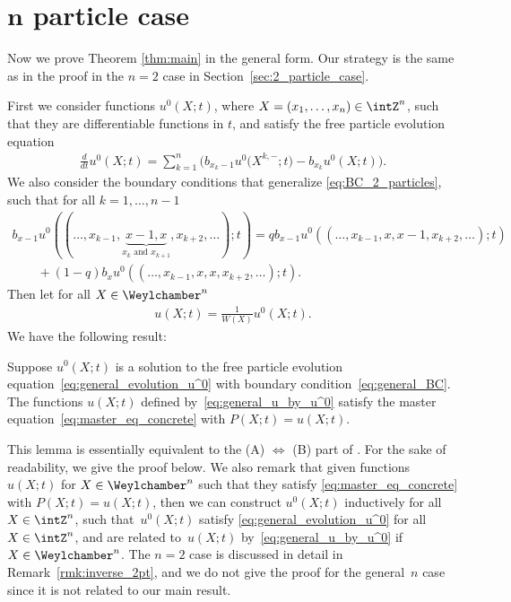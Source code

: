 \section[$n$ particle case]{$\boldsymbol{n}$ particle case} \label{sec:n_particle_case}

Now we prove Theorem \ref{thm:main} in the general form. Our strategy is the same as in the proof in the $n = 2$ case in Section~\ref{sec:2_particle_case}.

First we consider functions $u^0(X; t)$, where $X = (x_1, \dotsc, x_n) \in \intZ^n$, such that they are dif\/ferentiable functions in $t$, and satisfy the free particle evolution equation
\begin{gather} \label{eq:general_evolution_u^0}
 \frac{d}{dt} u^0(X; t) = \sum^n_{k = 1} \big( b_{x_k - 1} u^0\big(X^{k, -}; t\big) - b_{x_k} u^0(X; t) \big).
\end{gather}
We also consider the boundary conditions that generalize \eqref{eq:BC_2_particles}, such that for all $k = 1, \dotsc, n - 1$
\begin{gather}
 b_{x - 1} u^0((\dotsc, x_{k - 1}, \underbrace{x - 1, x}_{\text{$x_k$ and $x_{k + 1}$}}, x_{k + 2}, \dotsc); t) = q b_{x - 1} u^0((\dotsc, x_{k - 1}, x, x - 1, x_{k + 2}, \dotsc); t) \nonumber\\
 \qquad{}
+ (1 - q) b_x u^0((\dotsc, x_{k - 1}, x, x, x_{k + 2}, \dotsc); t).\label{eq:general_BC}
\end{gather}
Then let for all $X \in \Weylchamber^n$
\begin{gather} \label{eq:general_u_by_u^0}
 u(X; t) = \frac{1}{W(X)} u^0(X; t).
\end{gather}
We have the following result:
\begin{Lemma} \label{lem:BA_coefficients}
 Suppose $u^0(X; t)$ is a solution to the free particle evolution equation~\eqref{eq:general_evolution_u^0} with boundary condition~\eqref{eq:general_BC}. The functions $u(X; t)$ defined by~\eqref{eq:general_u_by_u^0} satisfy the master equation~\eqref{eq:master_eq_concrete} with $P(X; t) = u(X; t)$.
\end{Lemma}

This lemma is essentially equivalent to the (A) $\Leftrightarrow$ (B) part of \cite[Proposition 2.7]{Borodin-Corwin-Sasamoto14}. For the sake of readability, we give the proof below. We also remark that given functions $u(X; t)$ for $X \in \Weylchamber^n$ such that they satisfy \eqref{eq:master_eq_concrete} with $P(X; t) = u(X; t)$, then we can construct $u^0(X; t)$ inductively for all $X \in \intZ^n$, such that~$u^0(X; t)$ satisfy \eqref{eq:general_evolution_u^0} for all~$X \in \intZ^n$, and are related to~$u(X; t)$ by~\eqref{eq:general_u_by_u^0} if $X \in \Weylchamber^n$. The $n = 2$ case is discussed in detail in Remark~\ref{rmk:inverse_2pt}, and we do not give the proof for the general~$n$ case since it is not related to our main result.

